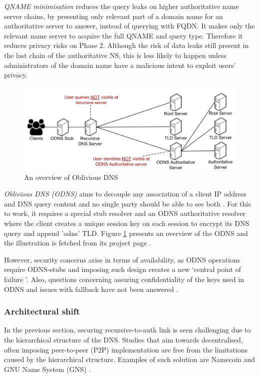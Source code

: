 \textit{QNAME minimisation} reduces the query leaks on higher authoritative name server chains, by presenting only relevant part of a domain name for an authoritative server to answer, instead of querying with FQDN.
It makes only the relevant name server to acquire the full QNAME and query type. Therefore it reduces privacy risks on Phase 2.
Although the risk of data leaks still present in the last chain of the authoritative NS, this is less likely to happen unless administrators of the domain name have a malicious intent to exploit users' privacy.

\begin{figure}[h!]
    \begin{center}
    \includegraphics*[width=0.9\columnwidth]{img/ODNSoverview}
    \end{center}
    \caption{An overview of Oblivious DNS \cite{ODNSwebsite}}
    \label{odnsoverview}
\end{figure}
\textit{Oblivious DNS (ODNS)} aims to decouple any association of a client IP address and DNS query content and no single party should be able to see both \cite{annee-dprive-oblivious-dns-00}.
For this to work, it requires a special stub resolver and an ODNS authoritative resolver where the client creates a unique session key on each session to encrypt its DNS query and append 'odns' TLD.
Figure \ref{odnsoverview} presents an overview of the ODNS and the illustration is fetched from its project page \cite{ODNSwebsite}.

However, security concerns arise in terms of availability, as ODNS operations require ODNS-stubs and imposing such design creates a new `central point of failure \cite{minutes-102-dprive}'.
Also, questions concerning assuring confidentiality of the keys used in ODNS and issues with fallback have not been answered \cite{minutes-102-dprive}.

\subsubsection{Architectural shift}
In the previous section, securing recursive-to-auth link is seen challenging due to the hierarchical structure of the DNS.
Studies that aim towards decentralised, often imposing peer-to-peer (P2P) implementation are free from the limitations caused by the hierarchical structure.
Examples of such solution are Namecoin \cite{loibl2014namecoin} and GNU Name System (GNS) \cite{grothoff2017nsa, wachs2014censorship}.

